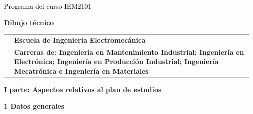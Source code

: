 \documentclass[letterpaper]{article}%
\begin{document}
%
\normalsize%
\thispagestyle{empty}%
%
\vspace*{150mm}%
\par\fontsize{14}{0}\selectfont \textcolor{black}{Programa del curso IEM2101}%
\par\fontsize{18}{25}\selectfont \textbf{\textcolor{azulsuaveTEC}{Dibujo técnico}}%
\begin{tabularx}{\textwidth}{m{}m{}}%
&\hspace*{0mm}\fontsize{12}{14}\selectfont \textbf{\textcolor{gris}{Escuela de Ingeniería Electromecánica}}\\%
[-4pt]%
&\hspace*{0mm}\fontsize{12}{14}\selectfont \textbf{\textcolor{gris}{Carreras de: Ingeniería en Mantenimiento Industrial; Ingeniería en Electrónica; Ingeniería en Producción Industrial; Ingeniería Mecatrónica e Ingeniería en Materiales}}\\%
\end{tabularx}%
\newpage%
\pagestyle{headfoot}%
\par\fontsize{14}{0}\selectfont \textbf{\textcolor{parte}{I parte: Aspectos relativos al plan de estudios}}%
\par\hspace*{4mm}\fontsize{12}{20}\selectfont \textbf{\textcolor{parte}{1 Datos generales}}%
\end{document}
